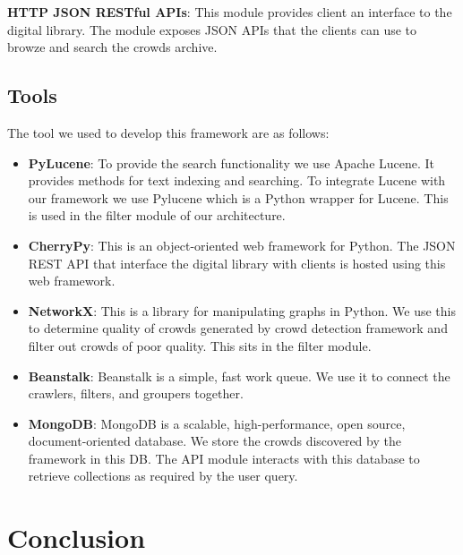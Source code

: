 \documentclass{sig-alternate}
\begin{document}
\medskip \noindent \textbf{HTTP JSON RESTful APIs}: This module provides client an interface to the digital library. The module exposes JSON APIs that the clients can use to browze and search the crowds archive.

\subsection{Tools}

The tool we used to develop this framework are as follows:
\begin{itemize}
 \item \noindent\textbf{PyLucene}: To provide the search functionality we use Apache Lucene. It provides methods for text indexing and searching. To integrate Lucene with our framework we use Pylucene which is a Python wrapper for Lucene. This is used in the filter module of our architecture.
 \item \noindent\textbf{CherryPy}: This is an object-oriented web framework for Python. The JSON REST API that interface the digital library with clients is hosted using this web framework.
 \item \noindent\textbf{NetworkX}: This is a library for manipulating graphs in Python. We use this to determine quality of crowds generated by crowd detection framework and filter out crowds of poor quality. This sits in the filter module.
  \item \noindent\textbf{Beanstalk}: Beanstalk is a simple, fast work queue. We use it to connect the crawlers, filters, and groupers together.
   \item \noindent\textbf{MongoDB}: MongoDB is a scalable, high-performance, open source, document-oriented database. We store the crowds discovered by the framework in this DB. The API module interacts with this database to retrieve collections as required by the user query.
\end{itemize}

\section{Conclusion}
\label{sec:conclusion}

{
 
 
}
\balancecolumns %
\end{document}
